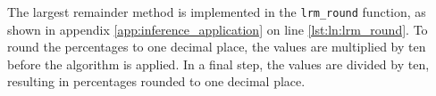 The largest remainder method is implemented in the \texttt{lrm\_round} function, as shown in appendix \ref{app:inference_application} on line \ref{lst:ln:lrm_round}. %
To round the percentages to one decimal place, the values are multiplied by ten before the algorithm is applied.
In a final step, the values are divided by ten, resulting in percentages rounded to one decimal place.


